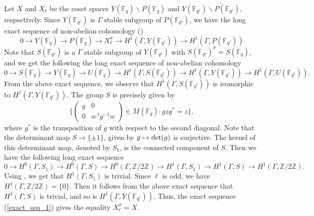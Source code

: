 \documentclass[10pt, reqno]{amsart}
\theoremstyle{plain}
\numberwithin{equation}{section} \newcommand{\di}{\operatorname{dim}}
\begin{document}
\subsubsection{}
Let $X$ and $X_\ell$ be the coset spaces
$Y(\mathbb{F}_{q})\backslash P(\mathbb{F}_{q})$ and
$Y(\mathbb{F}_{q^\ell})\backslash P(\mathbb{F}_{q^\ell})$,
respectively. Since $Y(\mathbb{F}_{q^\ell})$ is $\Gamma$ stable
subgroup of $P(\mathbb{F}_{q^\ell})$, we have the long exact sequence
of non-abelian cohomology (\cite[Appendix, Proposition
1]{Galois_cohomology_Serre})
\begin{equation}\label{exact_seq_1}
0\rightarrow Y(\mathbb{F}_{q})\rightarrow P(\mathbb{F}_{q})
\rightarrow X_\ell^\sigma\rightarrow
H^1(\Gamma,Y(\mathbb{F}_{q^\ell}))
\rightarrow H^1(\Gamma,P(\mathbb{F}_{q^\ell}))
\end{equation}
Note that $S(\mathbb{F}_{q^\ell})$ is a $\Gamma$ stable subgroup of
$Y(\mathbb{F}_{q^\ell})$ with
$S(\mathbb{F}_{q^\ell})^\sigma = S(\mathbb{F}_q)$, and we get the
following the long exact sequence of non-abelian cohomology
$$ 0\rightarrow S(\mathbb{F}_{q})\rightarrow
Y(\mathbb{F}_{q})\rightarrow U(\mathbb{F}_q)
\rightarrow H^1(\Gamma,S(\mathbb{F}_{q^\ell})) \rightarrow
H^1(\Gamma,Y(\mathbb{F}_{q^\ell})) \rightarrow
H^1(\Gamma,U(\mathbb{F}_{q^\ell})).$$ From the above exact sequence,
we observe that $H^1(\Gamma, S(\mathbb{F}_{q^\ell}))$ is isomorphic to
$H^1(\Gamma, Y(\mathbb{F}_{q^\ell}))$.  The group $S$ is precisely
given by
$$ \bigg\{\begin{pmatrix}
g & 0\\
0 & w\,^tg^{-1}w
\end{pmatrix}\in M(\overline{\mathbb{F}}_q) : gzg^\ast = z\bigg\}, $$
where $g^\ast$ is the transposition of $g$ with respect to the
second diagonal. Note that the determinant map $S\rightarrow \{\pm 1\}$, given by 
$g\mapsto {\rm det}(g)$ is surjective. 
The kernel of this determinant map, denoted by $S_1$,
is the connected component of $S$. Then we have the following
long exact sequence
$$ 0\rightarrow H^0(\Gamma, S_1)\rightarrow
H^0(\Gamma, S)\rightarrow H^0(\Gamma, \mathbb{Z}/2\mathbb{Z})
\rightarrow H^1(\Gamma,S_1) \rightarrow H^1(\Gamma,S) \rightarrow
H^1(\Gamma,\mathbb{Z}/2\mathbb{Z}).$$ 
Using \cite[Proposition
4.2.11]{Finte_groups_lie_type}, we get that $H^1(\Gamma,S_1)$ is
trivial. Since $\ell$ is odd,
we have $H^1(\Gamma,\mathbb{Z}/2\mathbb{Z})=\{0\}$.
Then it follows from the above exact
sequence that $H^1(\Gamma,S)$ is trivial, and so is
$H^1(\Gamma, Y(\mathbb{F}_{q^\ell}))$. Thus, the exact sequence
(\ref{exact_seq_1}) gives the equality $X_\ell^\sigma = X$.
\end{document}
